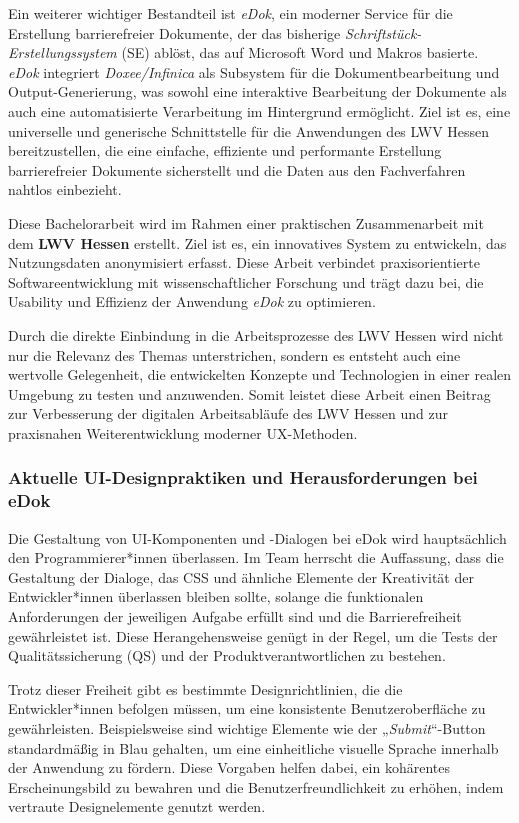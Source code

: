 \documentclass[12pt,oneside]{article}
\begin{document}
Ein weiterer wichtiger Bestandteil ist \textit{eDok}, ein moderner Service für die Erstellung barrierefreier Dokumente, der das bisherige \textit{Schriftstück-Erstellungssystem} (SE) ablöst, das auf Microsoft Word und Makros basierte. \textit{eDok} integriert \textit{Doxee/Infinica} als Subsystem für die Dokumentbearbeitung und Output-Generierung, was sowohl eine interaktive Bearbeitung der Dokumente als auch eine automatisierte Verarbeitung im Hintergrund ermöglicht. Ziel ist es, eine universelle und generische Schnittstelle für die Anwendungen des LWV Hessen bereitzustellen, die eine einfache, effiziente und performante Erstellung barrierefreier Dokumente sicherstellt und die Daten aus den Fachverfahren nahtlos einbezieht.

Diese Bachelorarbeit wird im Rahmen einer praktischen Zusammenarbeit mit dem \textbf{LWV Hessen} erstellt. Ziel ist es, ein innovatives System zu entwickeln, das Nutzungsdaten anonymisiert erfasst.
Diese Arbeit verbindet praxisorientierte Softwareentwicklung mit wissenschaftlicher Forschung und trägt dazu bei, die Usability und Effizienz der Anwendung \textit{eDok} zu optimieren.

Durch die direkte Einbindung in die Arbeitsprozesse des LWV Hessen wird nicht nur die Relevanz des Themas unterstrichen, sondern es entsteht auch eine wertvolle Gelegenheit, die entwickelten Konzepte und Technologien in einer realen Umgebung zu testen und anzuwenden. Somit leistet diese Arbeit einen Beitrag zur Verbesserung der digitalen Arbeitsabläufe des LWV Hessen und zur praxisnahen Weiterentwicklung moderner UX-Methoden.
 
\subsubsection*{Aktuelle UI-Designpraktiken und Herausforderungen bei eDok}

Die Gestaltung von UI-Komponenten und -Dialogen bei eDok wird hauptsächlich den Programmierer*innen überlassen. Im Team herrscht die Auffassung, dass die Gestaltung der Dialoge, das CSS und ähnliche Elemente der Kreativität der Entwickler*innen überlassen bleiben sollte, solange die funktionalen Anforderungen der jeweiligen Aufgabe erfüllt sind und die Barrierefreiheit gewährleistet ist. Diese Herangehensweise genügt in der Regel, um die Tests der Qualitätssicherung (QS) und der Produktverantwortlichen zu bestehen.

Trotz dieser Freiheit gibt es bestimmte Designrichtlinien, die die Entwickler*innen befolgen müssen, um eine konsistente Benutzeroberfläche zu gewährleisten. Beispielsweise sind wichtige Elemente wie der „\textit{Submit}“-Button standardmäßig in Blau gehalten, um eine einheitliche visuelle Sprache innerhalb der Anwendung zu fördern. Diese Vorgaben helfen dabei, ein kohärentes Erscheinungsbild zu bewahren und die Benutzerfreundlichkeit zu erhöhen, indem vertraute Designelemente genutzt werden.
\end{document}
